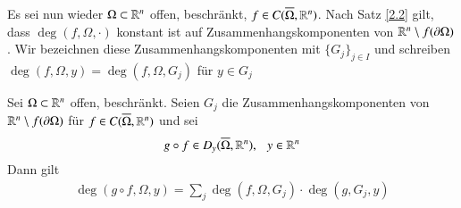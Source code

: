 Es sei nun wieder $\Omega \subset \mathbb{R}^n$ offen, beschränkt, $f\in C(\overline \Omega,\mathbb{R}^n)$. Nach Satz \ref{2.2}
gilt, dass $\deg(f,\Omega,\cdot)$ konstant ist auf Zusammenhangskomponenten von $\mathbb{R}^n\setminus f(\partial 
\Omega)$. Wir bezeichnen diese Zusammenhangskomponenten mit $\{G_j\}_{j\in I}$ und schreiben $\deg(f,
\Omega,y)=\deg(f,\Omega,G_j)$ für $y\in G_j$

\begin{theorem}[Produktregel]\label{2.15}
    Sei $\Omega\subset\mathbb{R}^n$ offen, beschränkt. Seien $G_j$ die Zusammenhangskomponenten von $\mathbb{R}^n
    \setminus f(\partial \Omega)$ für $f\in C(\overline\Omega, \mathbb{R}^n)$ und sei
    \[
        g\circ f \in D_y(\overline \Omega,\mathbb{R}^n), \hspace{.25cm} y\in \mathbb{R}^n
    \]
    Dann gilt
    \begin{align}\label{9}
        \deg(g\circ f, \Omega, y)=\sum_j\deg(f,\Omega,G_j)\cdot \deg(g,G_j,y)
    \end{align}
\end{theorem}

